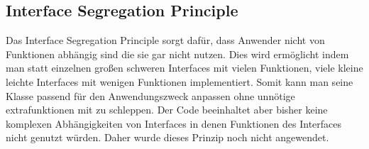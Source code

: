 \subsection{Interface Segregation Principle}
Das Interface Segregation Principle sorgt dafür, dass Anwender nicht von Funktionen abhängig sind die sie gar nicht nutzen.
Dies wird ermöglicht indem man statt einzelnen großen schweren Interfaces mit vielen Funktionen, viele kleine leichte Interfaces mit wenigen Funktionen implementiert.
Somit kann man seine Klasse passend für den Anwendungszweck anpassen ohne unnötige extrafunktionen mit zu schleppen.
Der Code beeinhaltet aber bisher keine komplexen Abhängigkeiten von Interfaces in denen Funktionen des Interfaces nicht genutzt würden.
Daher wurde dieses Prinzip noch nicht angewendet.

